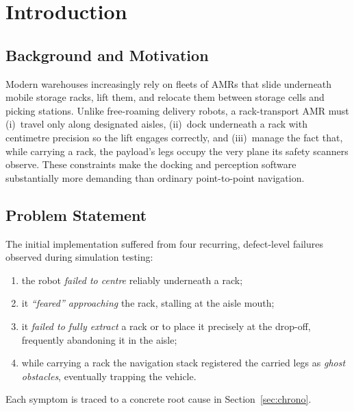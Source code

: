 \documentclass[11pt,a4paper]{article}
\begin{document}
\vspace{0.4cm}
\tableofcontents
\newpage

\section{Introduction}
\subsection{Background and Motivation}
Modern warehouses increasingly rely on fleets of AMRs that slide underneath
mobile storage racks, lift them, and relocate them between storage cells and
picking stations. Unlike free-roaming delivery robots, a rack-transport AMR
must (i)~travel only along designated aisles, (ii)~dock underneath a rack
with centimetre precision so the lift engages correctly, and (iii)~manage the
fact that, while carrying a rack, the payload's legs occupy the very plane
its safety scanners observe. These constraints make the docking and
perception software substantially more demanding than ordinary point-to-point
navigation.

\subsection{Problem Statement}
The initial implementation suffered from four recurring, defect-level
failures observed during simulation testing:
\begin{enumerate}[leftmargin=1.4em,itemsep=1pt]
  \item the robot \emph{failed to centre} reliably underneath a rack;
  \item it \emph{``feared'' approaching} the rack, stalling at the aisle mouth;
  \item it \emph{failed to fully extract} a rack or to place it precisely at
        the drop-off, frequently abandoning it in the aisle;
  \item while carrying a rack the navigation stack registered the carried
        legs as \emph{ghost obstacles}, eventually trapping the vehicle.
\end{enumerate}
Each symptom is traced to a concrete root cause in
Section~\ref{sec:chrono}.
\end{document}
